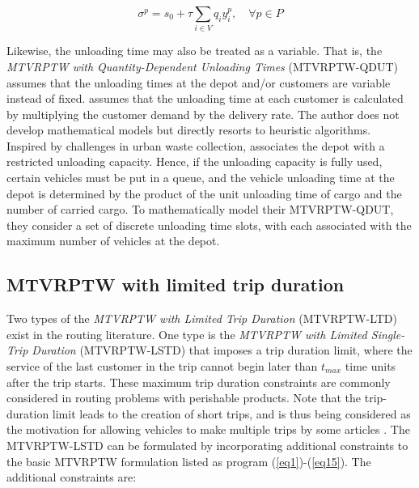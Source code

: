 \documentclass[11pt]{article}
\begin{document}
\begin{equation} \label{eq22}
    \sigma^p = s_0 + \tau \sum_{i \in V} q_i y^p_i, \quad \forall p \in P
\end{equation}

Likewise, the unloading time may also be treated as a variable. That is, the \textit{MTVRPTW with Quantity-Dependent Unloading Times} (MTVRPTW-QDUT) assumes that the unloading times at the depot and/or customers are variable instead of fixed.  \cite{karoonsoontawong2015efficient} assumes that the unloading time at each customer is calculated by multiplying the customer demand by the delivery rate.  The author does not develop mathematical models but directly resorts to heuristic algorithms.  Inspired by challenges in urban waste collection, \cite{huang2021multi} associates the depot with a restricted unloading capacity.  Hence, if the unloading capacity is fully used, certain vehicles must be put in a queue, and the vehicle unloading time at the depot is determined by the product of the unit unloading time of cargo and the number of carried cargo.  To mathematically model their MTVRPTW-QDUT, they consider a set of discrete unloading time slots, with each associated with the maximum number of vehicles at the depot.

\subsection{MTVRPTW with limited trip duration}


Two types of the \textit{MTVRPTW with Limited Trip Duration} (MTVRPTW-LTD) exist in the routing literature.  One type is the \textit{MTVRPTW with Limited Single-Trip Duration} (MTVRPTW-LSTD) that imposes a trip duration limit, where the service of the last customer in the trip cannot begin later than $t_{max}$ time units after the trip starts.  These maximum trip duration constraints are commonly considered in routing problems with perishable products.  Note that the trip-duration limit leads to the creation of short trips, and is thus being considered as the motivation for allowing vehicles to make multiple trips by some articles \citep[e.g.,][]{azi2010exact, azi2014adaptive}.  The MTVRPTW-LSTD can be formulated by incorporating additional constraints to the basic MTVRPTW formulation listed as program (\ref{eq1})-(\ref{eq15}).  The additional constraints are:
\end{document}
